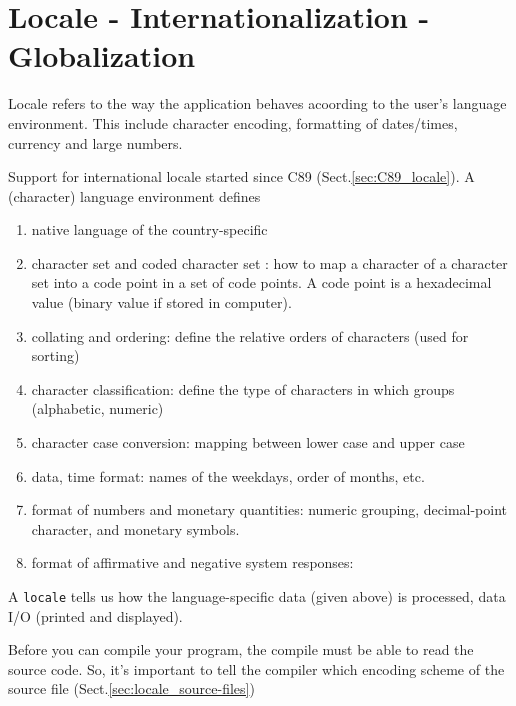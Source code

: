 \chapter{Locale - Internationalization - Globalization}
\label{chap:locale}

Locale refers to the way the application behaves acoording to the user's
language environment. This include character encoding, formatting of
dates/times, currency and large numbers.

Support for international locale started since C89 (Sect.\ref{sec:C89_locale}).
A (character) language environment defines
\begin{enumerate}
  \item native language of the country-specific
  \item character set and coded character set : how to map a character of a
  character set into a code point in a set of code points. A code point is a
  hexadecimal value (binary value if stored in computer). 

  \item collating and ordering: define the relative orders of characters (used
  for sorting)
  
  \item character classification: define the type of characters in which groups
  (alphabetic, numeric)
  
  \item character case conversion: mapping between lower case and upper case
  
  \item data, time format: names of the weekdays, order of months, etc.
  \item format of numbers and monetary quantities: numeric grouping,
  decimal-point character, and monetary symbols.
  
  \item format of affirmative and negative system responses: 
\end{enumerate}
A \verb!locale! tells us how the language-specific data (given above)
is processed, data I/O (printed and displayed). 

Before you can compile your program, the compile must be able to read the source
code. So, it's important to tell the compiler which encoding
scheme of the source file (Sect.\ref{sec:locale_source-files})


